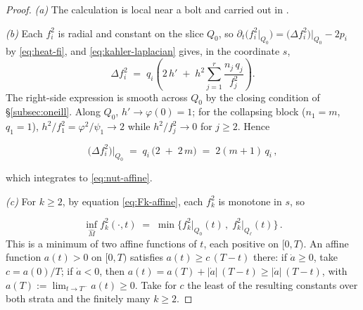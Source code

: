 \documentclass[11pt]{amsart}
\theoremstyle{plain}
\numberwithin{equation}{section}
\theoremstyle{definition}
\theoremstyle{remark}
\begin{document}
\begin{proof}
	\emph{(a)} The calculation is local near a bolt and carried out in \cite{FT}.
	
	
	\emph{(b)} Each $f_i^2$ is radial and constant on the slice $Q_0$, so $\partial_t \big( f_i^2 |_{Q_0} \big) = \big( \Delta f_i^2 \big) \big|_{Q_0} - 2 p_i$ by \eqref{eq:heat-fi}, and \eqref{eq:kahler-laplacian} gives, in the coordinate $s$, 	
	\[
	\Delta f_i^2 \;=\; q_i \left( 2\, h' \;+\; h^2 \sum_{j = 1}^r \frac{n_j\, q_j}{f_j^2} \right).
	\]
	The right-side expression is smooth across $Q_0$ by the closing condition of \S\ref{subsec:oneill}. Along $Q_0$, $h' \to \varphi ( 0 ) = 1$; for the collapsing block ($n_1 = m$, $q_1 = 1$), $h^2 / f_1^2 = \varphi^2 / \psi_1 \to 2$ %
	while $h^2 / f_j^2 \to 0$ for $j \geq 2$. Hence
	
	\[
	\big( \Delta f_i^2 \big) \big|_{Q_0} \;=\; q_i\, \big( 2 \;+\; 2\, m \big) \;=\; 2 ( m + 1 )\, q_i \,,
	\]
	
	which integrates to \eqref{eq:nut-affine}. %
	
	\emph{(c)} For $k\geq 2$, by equation \ref{eq:Fk-affine}, each $f_k^2$ is monotone in $s$, so
	
	\[
	\inf_{\widehat{M}} f_k^2 (\cdot, t) \;=\; \min \Big\{ f_k^2 \big|_{Q_0} (t) \,, \; f_k^2 \big|_{Q_\ell} (t) \Big\} \,.
	\]
	This is a minimum of two affine functions of $t$, each positive on $[0, T)$. An affine function $a (t) > 0$ on $[0, T)$ satisfies $a (t) \geq c\, ( T - t )$ there: if $\dot{a} \geq 0$, take $c = a (0) / T$; if $\dot{a} < 0$, then $a (t) = a (T) + | \dot{a} |\, ( T - t ) \geq | \dot{a} |\, ( T - t )$, with $a (T) := \lim_{t \to T^-} a (t) \geq 0$. Take for $c$ the least of the resulting constants over both strata and the finitely many $k \geq 2$.
\end{proof}
\end{document}
